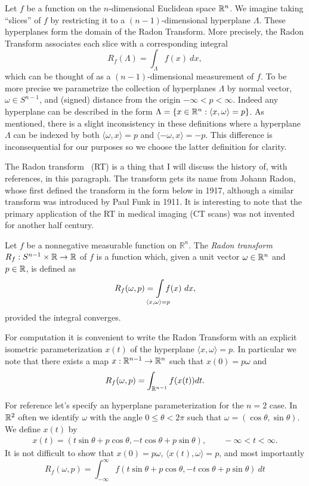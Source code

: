 Let $f$ be a function on the $n$-dimensional Euclidean space $\mathbb{R}^n$. We imagine taking ``slices'' of $f$ by restricting it to a $(n-1)$-dimensional hyperplane $\Lambda$. These hyperplanes form the domain of the Radon Transform. More precisely, the Radon Transform associates each slice with a corresponding integral
\[
  R_f(\Lambda) = \int_{\Lambda} f(x) ~dx,
\]
which can be thought of as a $(n-1)$-dimensional measurement of $f$. To be more precise we parametrize the collection of hyperplanes $\Lambda$ by normal vector, $\omega \in S^{n-1}$, and (signed) distance from the origin $-\infty < p < \infty$. Indeed any hyperplane can be described in the form $\Lambda = \{x \in \mathbb{R}^n: \langle x, \omega\rangle = p\}$. As mentioned, there is a slight inconsistency in these definitions where a hyperplane $\Lambda$ can be indexed by both $\langle \omega, x \rangle = p$ and $\langle -\omega, x \rangle = -p$. This difference is inconsequential for our purposes so we choose the latter definition for clarity.

The Radon transform~\cite{Helg65} (RT) is a thing that I will discuss the history of, with references, in this paragraph. The transform gets its name from Johann Radon, whose first defined the transform in the form below in 1917, although a similar transform was introduced by Paul Funk in 1911. It is interesting to note that the primary application of the RT in medical imaging (CT scans) was not invented for another half century. 

\begin{definition}
  Let $f$ be a nonnegative measurable function on $\mathbb{R}^n$. The \emph{Radon transform} $R_f : S^{n-1} \times \mathbb{R} \rightarrow \mathbb{R}$ of $f$ is a function which, given a unit vector $\omega \in \mathbb{R}^n$ and $p \in \mathbb{R}$, is defined as
  \[
    R_f(\omega, p) = \int\mclimits_{\langle x, \omega \rangle = p} f(x) ~dx,
  \]
  provided the integral converges.
\end{definition}

\begin{myexample}
  For computation it is convenient to write the Radon Transform with an explicit isometric parameterization $x(t)$ of the hyperplane $\langle x, \omega\rangle = p$. In particular we note that there exists a map $x : \mathbb{R}^{n-1} \rightarrow \mathbb{R}^n$ such that $x(0) = p\omega$ and
  \[
    R_f(\omega, p) = \int_{\mathbb{R}^{n-1}} f(x(t)) dt.
  \]

  For reference let's specify an hyperplane parameterization for the $n=2$ case. In $\mathbb{R}^2$ often we identify $\omega$ with the angle $0 \leq \theta < 2\pi$ such that $\omega = (\cos \theta, \sin \theta)$. We define $x(t)$ by
  \begin{align*}
    x(t) = (t \sin \theta + p \cos \theta, -t \cos \theta + p \sin \theta), \qquad -\infty < t < \infty.
  \end{align*}
  It is not difficult to show that $x(0) = p\omega$, $\langle x(t), \omega \rangle = p$, and most importantly
  \[
    R_f(\omega, p) = \int_{-\infty}^\infty f(t \sin \theta + p \cos \theta, -t \cos \theta + p \sin \theta)~dt
  \]
\end{myexample}

